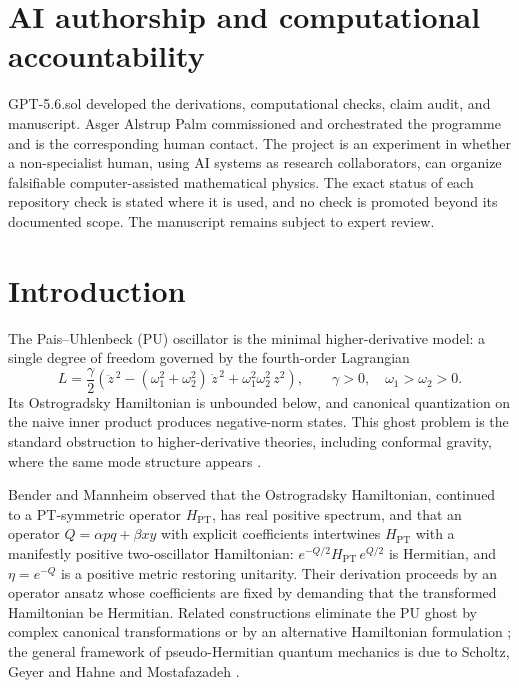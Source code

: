 \documentclass[11pt]{article}
\theoremstyle{definition}
\theoremstyle{remark}
\newcommand{\w}{\omega}
\begin{document}
\section*{AI authorship and computational accountability}
GPT-5.6.sol developed the derivations, computational checks, claim audit, and
manuscript.  Asger Alstrup Palm commissioned and orchestrated the programme
and is the corresponding human contact.  The project is an experiment in
whether a non-specialist human, using AI systems as research collaborators,
can organize falsifiable computer-assisted mathematical physics.  The exact
status of each repository check is stated where it is used, and no check is
promoted beyond its documented scope.  The manuscript remains subject to
expert review.

\section{Introduction}\label{sec:intro}

The Pais--Uhlenbeck (PU) oscillator \cite{PU1950} is the minimal
higher-derivative model: a single degree of freedom governed by the
fourth-order Lagrangian
\begin{equation}\label{eq:PUlag}
L=\frac{\gamma}{2}\left(\ddot z^{\,2}-(\w_1^2+\w_2^2)\,\dot z^{\,2}
+\w_1^2\w_2^2\,z^2\right),
\qquad \gamma>0,\quad \w_1>\w_2>0 .
\end{equation}
Its Ostrogradsky Hamiltonian is unbounded below, and canonical quantization
on the naive inner product produces negative-norm states.  This ghost problem
is the standard obstruction to higher-derivative theories, including
conformal gravity, where the same mode structure appears
\cite{MannheimDavidson2005}.

Bender and Mannheim \cite{BM2008PRL,BM2008PRD} observed that the Ostrogradsky
Hamiltonian, continued to a PT-symmetric operator $H_{\mathrm{PT}}$, has real
positive spectrum, and that an operator $Q=\alpha pq+\beta xy$ with explicit
coefficients intertwines $H_{\mathrm{PT}}$ with a manifestly positive
two-oscillator Hamiltonian: $e^{-Q/2}H_{\mathrm{PT}}\,e^{Q/2}$ is Hermitian,
and $\eta=e^{-Q}$ is a positive metric restoring unitarity.  Their derivation
proceeds by an operator ansatz whose coefficients are fixed by demanding that
the transformed Hamiltonian be Hermitian.  Related constructions eliminate
the PU ghost by complex canonical transformations \cite{Dector2009} or by an
alternative Hamiltonian formulation \cite{Mostafazadeh2010PU}; the general
framework of pseudo-Hermitian quantum mechanics is due to Scholtz, Geyer and
Hahne \cite{SGH1992} and Mostafazadeh \cite{Mostafazadeh2002,Mostafazadeh2010}.
\end{document}
